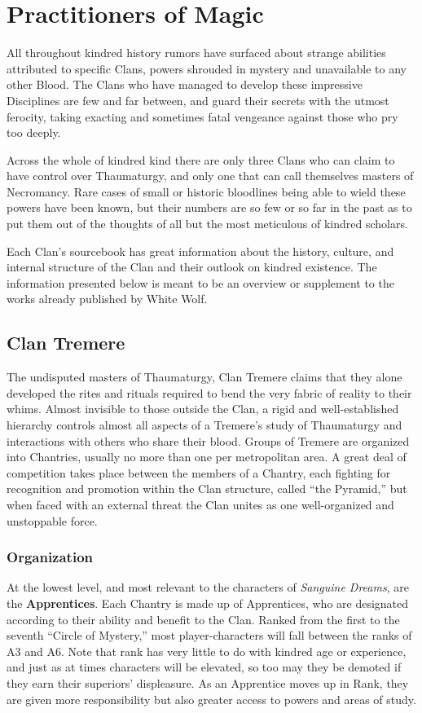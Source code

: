 \section{Practitioners of Magic}
\label{sec:clans}
All throughout kindred history rumors have surfaced about strange abilities attributed 
to specific Clans, powers shrouded in mystery and unavailable to any other Blood.  The 
Clans who have managed to develop these impressive Disciplines are few and far between, 
and guard their secrets with the utmost ferocity, taking exacting and sometimes fatal 
vengeance against those who pry too deeply.

Across the whole of kindred kind there are only three Clans who can claim to have control 
over Thaumaturgy, and only one that can call themselves masters of Necromancy.  Rare 
cases of small or historic bloodlines being able to wield these powers have been known, 
but their numbers are so few or so far in the past as to put them out of the thoughts of 
all but the most meticulous of kindred scholars.

Each Clan's sourcebook has great information about the history, culture, and internal 
structure of the Clan and their outlook on kindred existence.  The information presented 
below is meant to be an overview or supplement to the works already published by 
White Wolf.

\subsection{Clan Tremere}
\label{sec:tremere}
The undisputed masters of Thaumaturgy, Clan Tremere claims that they alone developed 
the rites and rituals required to bend the very fabric of reality to their whims.  
Almost invisible to those outside the Clan, a rigid and well-established hierarchy 
controls almost all aspects of a Tremere's study of Thaumaturgy and interactions with 
others who share their blood.  Groups of Tremere are organized into Chantries, usually 
no more than one per metropolitan area.  A great deal of competition takes place 
between the members of a Chantry, each fighting for recognition and promotion within 
the Clan structure, called ``the Pyramid,'' but when faced with an external threat the 
Clan unites as one well-organized and unstoppable force.

\subsubsection{Organization}
At the lowest level, and most relevant to the characters of \emph{Sanguine Dreams}, are 
the \textbf{Apprentices}.  Each Chantry is made up of Apprentices, who are designated 
according to their ability and benefit to the Clan.  Ranked from the first to the seventh 
``Circle of Mystery,'' most player-characters will fall between the ranks of A3 and A6.  
Note that rank has very little to do with kindred age or experience, and just as at times 
characters will be elevated, so too may they be demoted if they earn their superiors' 
displeasure.  As an Apprentice moves up in Rank, they are given more responsibility but 
also greater access to powers and areas of study.

